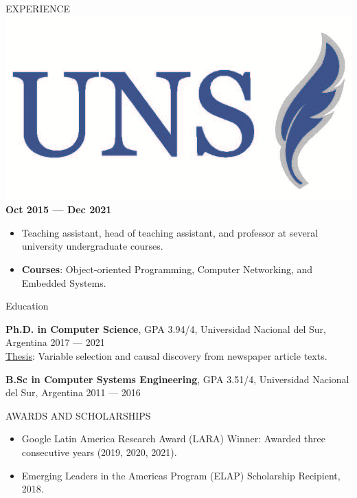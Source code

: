 \documentclass{resume}
\begin{document}
\begin{rSection}{EXPERIENCE}
\vspace{-0.2cm}
\includegraphics[height=3\fontcharht\font`\B]{uns_logo.png}%
 \hfill \textbf{Oct 2015 --- Dec 2021}\vspace{-0.2cm}
\begin{itemize}
    \item Teaching assistant, head of teaching assistant, and professor at several university undergraduate courses.
    \vspace{-0.25cm}
    \item \textbf{Courses}: Object-oriented Programming, Computer Networking, and Embedded Systems. 
\end{itemize}
\end{rSection} 



\vspace{-0.2cm}
\begin{rSection}{Education}

{\bf Ph.D. in Computer Science}, GPA 3.94/4, Universidad Nacional del Sur, Argentina \hfill {2017 --- 2021}\\
\underline{Thesis}: Variable selection and causal discovery from  newspaper article texts.\\

\vspace{-0.6cm}


{\bf B.Sc in Computer Systems Engineering}, GPA 3.51/4, Universidad Nacional del Sur, Argentina \hfill {2011 --- 2016}\\
\vspace{-0.2cm}
\end{rSection}






\vspace{-0.22cm}
\begin{rSection}{AWARDS AND SCHOLARSHIPS} 
\begin{itemize}
    \item Google Latin America Research Award (LARA) Winner: Awarded three consecutive years (2019, 2020, 2021).
    \vspace{-0.25cm}
    \item Emerging Leaders in the Americas Program (ELAP) Scholarship Recipient, 2018.  
\end{itemize}
\end{rSection}
\end{document}

